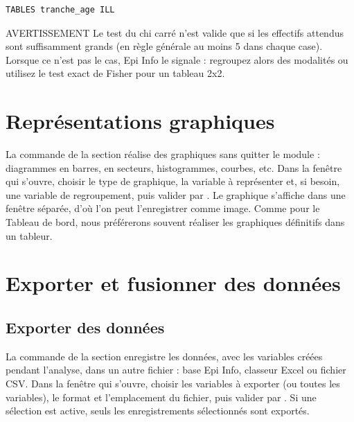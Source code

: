 \begin{tcolorbox}
	\begin{lstlisting}[language=EPIscript, style=mystyle, caption={Tableau croisé des tranches d'âge et de la maladie}, label=lst:mxn]
TABLES tranche_age ILL
	\end{lstlisting}
\end{tcolorbox}

\begin{mybox}[colbacktitle=CAUTION]{\faFire{} AVERTISSEMENT}
Le test du chi carré n'est valide que si les effectifs attendus sont suffisamment grands (en règle générale au moins 5 dans chaque case). Lorsque ce n'est pas le cas, Epi Info le signale : regroupez alors des modalités ou utilisez le test exact de Fisher pour un tableau 2x2.
\end{mybox}

\section{Représentations graphiques}

La commande  de la section  réalise des graphiques sans quitter le module : diagrammes en barres, en secteurs, histogrammes, courbes, etc. Dans la fenêtre qui s'ouvre, choisir le type de graphique, la variable à représenter et, si besoin, une variable de regroupement, puis valider par . Le graphique s'affiche dans une fenêtre séparée, d'où l'on peut l'enregistrer comme image. Comme pour le Tableau de bord, nous préférerons souvent réaliser les graphiques définitifs dans un tableur.

\section{Exporter et fusionner des données}

\subsection{Exporter des données}

La commande  de la section  enregistre les données, avec les variables créées pendant l'analyse, dans un autre fichier : base Epi Info, classeur Excel ou fichier CSV. Dans la fenêtre qui s'ouvre, choisir les variables à exporter (ou toutes les variables), le format et l'emplacement du fichier, puis valider par . Si une sélection est active, seuls les enregistrements sélectionnés sont exportés.

